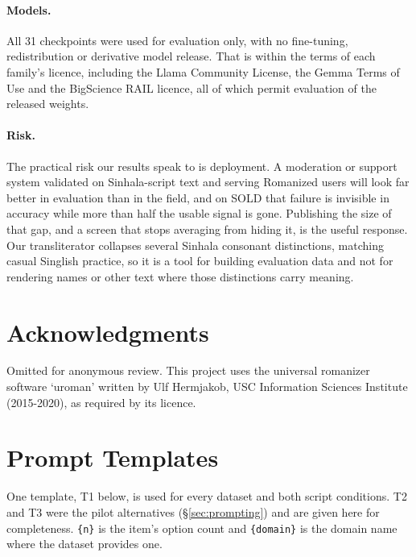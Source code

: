 \documentclass[11pt]{article}
\begin{document}
\paragraph{Models.} All 31 checkpoints were used for evaluation only, with no
fine-tuning, redistribution or derivative model release. That is within the terms
of each family's licence, including the Llama Community License, the Gemma Terms
of Use and the BigScience RAIL licence, all of which permit evaluation of the
released weights.

\paragraph{Risk.} The practical risk our results speak to is deployment. A
moderation or support system validated on Sinhala-script text and serving
Romanized users will look far better in evaluation than in the field, and on SOLD
that failure is invisible in accuracy while more than half the usable signal is
gone. Publishing the size of that gap, and a screen that stops averaging from
hiding it, is the useful response. Our transliterator collapses several Sinhala
consonant distinctions, matching casual Singlish practice, so it is a tool for
building evaluation data and not for rendering names or other text where those
distinctions carry meaning.

\section*{Acknowledgments}

Omitted for anonymous review. This project uses the universal romanizer software
`uroman' written by Ulf Hermjakob, USC Information Sciences Institute
(2015-2020), as required by its licence.



\appendix

\section{Prompt Templates}
\label{sec:prompts}

One template, T1 below, is used for every dataset and both script conditions. T2
and T3 were the pilot alternatives (\S\ref{sec:prompting}) and are given here for
completeness. \texttt{\{n\}} is the item's option count and \texttt{\{domain\}}
is the domain name where the dataset provides one.
\end{document}
